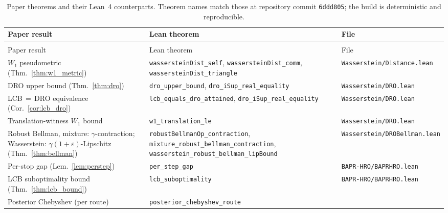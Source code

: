 \documentclass[11pt]{article}
\theoremstyle{definition}
\theoremstyle{remark}
\begin{document}
{\scriptsize
\setlength{\tabcolsep}{3pt}
\begin{longtable}{>{\raggedright\arraybackslash}p{4.0cm}>{\raggedright\arraybackslash}p{6.4cm}>{\raggedright\arraybackslash}p{3.4cm}}
\caption{\normalsize Paper theorems and their Lean~4 counterparts. Theorem names
match those at repository commit \texttt{6ddd805}; the build is
deterministic and reproducible.}
\label{tab:xref} \\
\toprule
Paper result & Lean theorem & File \\
\midrule
\endfirsthead
\multicolumn{3}{l}{\emph{Table~\ref{tab:xref} continued.}} \\
\toprule
Paper result & Lean theorem & File \\
\midrule
\endhead
$W_1$ pseudometric (Thm.~\ref{thm:w1_metric}) &
  \texttt{wassersteinDist\_self},\newline
  \texttt{wassersteinDist\_comm},\newline
  \texttt{wassersteinDist\_triangle} &
  \texttt{Wasserstein/Distance.lean} \\
DRO upper bound (Thm.~\ref{thm:dro}) &
  \texttt{dro\_upper\_bound},\newline
  \texttt{dro\_iSup\_real\_equality} &
  \texttt{Wasserstein/DRO.lean} \\
LCB$\,=\,$DRO equivalence (Cor.~\ref{cor:lcb_dro}) &
  \texttt{lcb\_equals\_dro\_attained},\newline
  \texttt{dro\_iSup\_real\_equality} &
  \texttt{Wasserstein/DRO.lean} \\
Translation-witness $W_1$ bound &
  \texttt{w1\_translation\_le} &
  \texttt{Wasserstein/DRO.lean} \\
Robust Bellman, mixture: $\gamma$-contraction;\newline
Wasserstein: $\gamma(1+\varepsilon)$-Lipschitz (Thm.~\ref{thm:bellman}) &
  \texttt{robustBellmanOp\_contraction},\newline
  \texttt{mixture\_robust\_bellman\_\allowbreak contraction},\newline
  \texttt{wasserstein\_robust\_bellman\_\allowbreak lipBound} &
  \texttt{Wasserstein/DROBellman.lean} \\
Per-stop gap (Lem.~\ref{lem:perstep}) &
  \texttt{per\_step\_gap} &
  \texttt{BAPR-HRO/BAPRHRO.lean} \\
LCB suboptimality bound (Thm.~\ref{thm:lcb_bound}) &
  \texttt{lcb\_suboptimality} &
  \texttt{BAPR-HRO/BAPRHRO.lean} \\
Posterior Chebyshev (per route) &
  \texttt{posterior\_chebyshev\_route} &

\end{longtable}}
\end{document}
